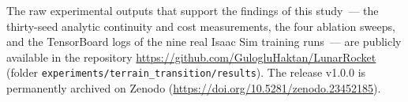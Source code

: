 The raw experimental outputs that support the findings of this study~--- the thirty-seed analytic continuity and cost measurements, the four ablation sweeps, and the TensorBoard logs of the nine real Isaac Sim training runs~--- are publicly available in the repository \url{https://github.com/GulogluHaktan/LunarRocket} (folder \texttt{experiments/terrain\_transition/results}). The release v1.0.0 is permanently archived on Zenodo (\url{https://doi.org/10.5281/zenodo.23452185}).

